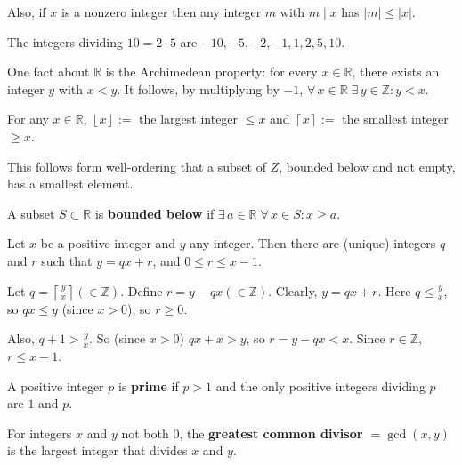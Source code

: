 \documentclass{notes}
\begin{document}
Also, if $x$ is a nonzero integer then any integer $m$ with $m \mid x$ has $\left | m \right | \leq \left | x \right |$.

\begin{eg}
  The integers dividing $10 = 2 \cdot 5$ are $-10, -5, -2, -1, 1, 2, 5, 10$.
\end{eg}

\begin{rmk}
  One fact about $\mathbb R$ is the Archimedean property: for every $x \in \mathbb R$, there exists an integer $y$ with $x < y$.
  It follows, by multiplying by $-1$, $\forall \, x \in \mathbb R \; \exists \, y \in \mathbb Z: y < x$.
\end{rmk}

\underline{} For any $x \in \mathbb R$, $\left \lfloor x \right \rfloor :=$ the largest integer $\leq x$ and $\left \lceil x \right \rceil :=$ the smallest integer $\geq x$.

This follows form well-ordering that a subset of $Z$, bounded below and not empty, has a smallest element.

\begin{defn}
  A subset $S \subset \mathbb R$ is {\boldmath \bfseries bounded below} if $\exists \, a \in \mathbb R \; \forall \, x \in S: x \geq a$.
\end{defn}

\begin{thm}
  Let $x$ be a positive integer and $y$ any integer.
  Then there are (unique) integers $q$ and $r$ such that $y = q x + r$, and $0 \leq r \leq x - 1$.
\end{thm}

\begin{prf}
  Let $q = \left \lceil \frac{y}{x} \right \rceil (\in \mathbb Z)$.
  Define $r = y - q x (\in \mathbb Z)$.
  Clearly, $y = q x + r$.
  Here $q \leq \frac{y}{x}$, so $q x \leq y$ (since $x > 0$), so $r \geq 0$.

  Also, $q + 1 > \frac{y}{x}$.
  So (since $x > 0$) $q x + x > y$, so $r = y - q x < x$.
  Since $r \in \mathbb Z$, $r \leq x - 1$.
\end{prf}

\begin{defn}
  A positive integer $p$ is {\boldmath \bfseries prime} if $p > 1$ and the only positive integers dividing $p$ are $1$ and $p$.
\end{defn}

\begin{defn}
  For integers $x$ and $y$ not both $0$, the {\boldmath \bfseries greatest common divisor $= \gcd(x, y)$} is the largest integer that divides $x$ and $y$.
\end{defn}
\end{document}
